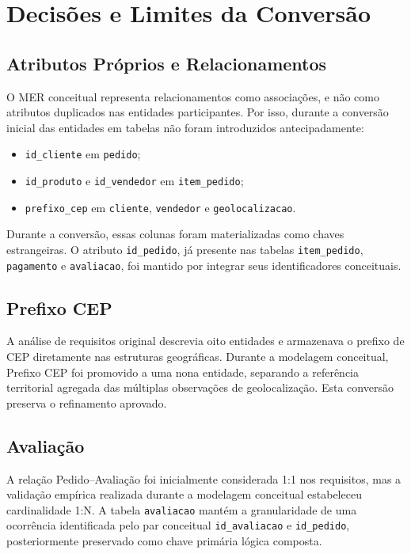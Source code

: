 \documentclass[12pt,a4paper]{article}
\begin{document}
	\section{Decisões e Limites da Conversão}
	\subsection{Atributos Próprios e Relacionamentos}
	O MER conceitual representa relacionamentos como associações, e não como
	atributos duplicados nas entidades participantes. Por isso, durante a conversão
	inicial das entidades em tabelas não foram introduzidos antecipadamente:
	\begin{itemize}[leftmargin=1.2cm]
		\item \texttt{id\_cliente} em \texttt{pedido};
		\item \texttt{id\_produto} e \texttt{id\_vendedor} em \texttt{item\_pedido};
		\item \texttt{prefixo\_cep} em \texttt{cliente}, \texttt{vendedor} e \texttt{geolocalizacao}.
	\end{itemize}

	Durante a conversão, essas colunas foram materializadas como chaves estrangeiras. O
	atributo \texttt{id\_pedido}, já presente nas tabelas \texttt{item\_pedido},
	\texttt{pagamento} e \texttt{avaliacao}, foi mantido por integrar seus
	identificadores conceituais.

	\subsection{Prefixo CEP}
	A análise de requisitos original descrevia oito entidades e armazenava o
	prefixo de CEP diretamente nas estruturas geográficas. Durante a modelagem conceitual, Prefixo CEP foi promovido a uma nona entidade, separando a
	referência territorial agregada das múltiplas observações de geolocalização.
	Esta conversão preserva o refinamento aprovado.

	\subsection{Avaliação}
	A relação Pedido--Avaliação foi inicialmente considerada 1:1 nos requisitos,
	mas a validação empírica realizada durante a modelagem conceitual estabeleceu cardinalidade 1:N. A tabela
	\texttt{avaliacao} mantém a granularidade de uma ocorrência identificada pelo
	par conceitual \texttt{id\_avaliacao} e \texttt{id\_pedido}, posteriormente
	preservado como chave primária lógica composta.
\end{document}
